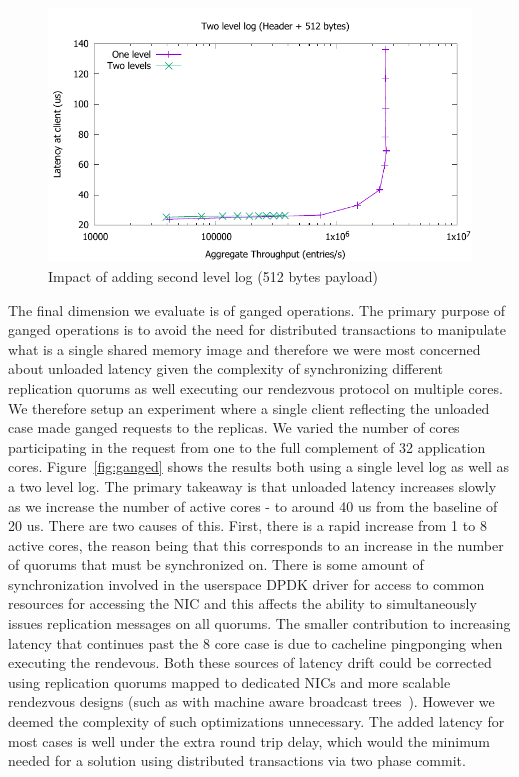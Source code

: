 \documentclass[10pt, preprint, nonatbib]{sigplanconf}
\begin{document}
\begin{figure}
\includegraphics[scale=0.6]{results2/flashlog_512.pdf}
\caption{Impact of adding second level log (512 bytes payload)}
\label{fig:flashlog_512}
\end{figure}

The final dimension we evaluate is of ganged operations. The primary purpose of
ganged operations is to avoid the need for distributed transactions to
manipulate what is a single shared memory image and therefore we were most
concerned about unloaded latency given the complexity of synchronizing different
replication quorums as well executing our rendezvous protocol on multiple
cores. We therefore setup an experiment where a single client reflecting the
unloaded case made ganged requests to the replicas. We varied the number of
cores participating in the request from one to the full complement of 32
application cores. Figure~\ref{fig:ganged} shows the results both using a single
level log as well as a two level log. The primary takeaway is that unloaded
latency increases slowly as we increase the number of active cores - to around
40 us from the baseline of 20 us. There are two causes of this. First, there is
a rapid increase from 1 to 8 active cores, the reason being that this
corresponds to an increase in the number of quorums that must be synchronized
on. There is some amount of synchronization involved in the userspace DPDK
driver for access to common resources for accessing the NIC and this affects the
ability to simultaneously issues replication messages on all quorums. The
smaller contribution to increasing latency that continues past the 8 core case
is due to cacheline pingponging when executing the rendevous. Both these sources
of latency drift could be corrected using replication quorums mapped to
dedicated NICs and more scalable rendezvous designs (such as with machine aware
broadcast trees~\cite{broadcast_tree}). However we deemed the complexity of such
optimizations unnecessary. The added latency for most cases is well under the
extra round trip delay, which would the minimum needed for a solution using
distributed transactions via two phase commit.
\end{document}
